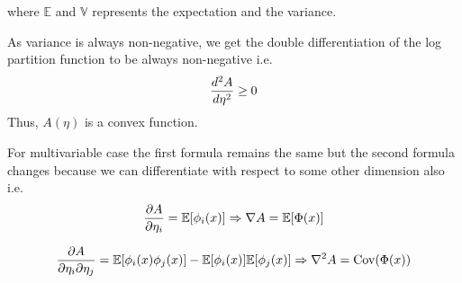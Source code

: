 \documentclass{homework}
\begin{document}
where $\mathbb{E}$ and $\mathbb{V}$ represents the expectation and the variance.

As variance is always non-negative, we get the double differentiation of the log partition function to be always non-negative i.e. 
$$
{d^2 A \over d \eta^2} \ge 0
$$
Thus, $A(\eta)$ is a convex function.

For multivariable case the first formula remains the same but the second formula changes because we can differentiate with respect to some other dimension also i.e. 
$$
{\partial A \over \partial \eta_i} = \mathbb{E}[\phi_i(x)]
\Rightarrow \nabla A = \mathbb{E}[\Phi(x)]
$$

$$
{\partial A \over \partial \eta_i \partial \eta_j} = \mathbb{E}[\phi_i(x) \phi_j(x)] - \mathbb{E}[\phi_i(x)]\mathbb{E}[\phi_j(x)]
\Rightarrow \nabla^2 A = \mathrm{Cov}(\Phi(x))
$$
\end{document}

